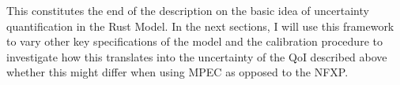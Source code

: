 This constitutes the end of the description on the basic idea of uncertainty quantification in the Rust Model. In the next sections, I will use this framework to vary other key specifications of the model and the calibration procedure to investigate how this translates into the uncertainty of the QoI described above whether this might differ when using MPEC as opposed to the NFXP.









